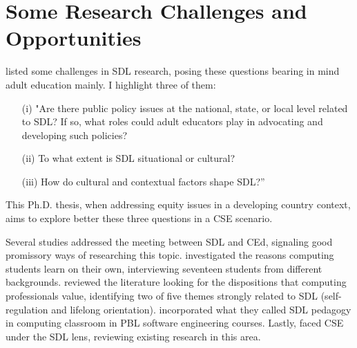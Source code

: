 \section{Some Research Challenges and Opportunities}
\label{sdl-sec:challenges}

 listed some challenges in \gls{SDL} research, posing these questions bearing in mind adult education mainly. I highlight three of them:
\begin{itemize}
    \item[(i)] "Are there public policy issues at the national, state, or local level related to \gls{SDL}? If so, what roles could adult educators play in advocating and developing such policies?
    \item[(ii)] To what extent is \gls{SDL} situational or cultural?
    \item[(iii)] How do cultural and contextual factors shape \gls{SDL}?”
\end{itemize}
This \gls{Ph.D.} thesis, when addressing equity issues in a developing country context, aims to explore better these three questions in a \gls{CSE} scenario.

Several studies addressed the meeting between \gls{SDL} and \gls{CEd}, signaling good promissory ways of researching this topic.  investigated the reasons computing students learn on their own, interviewing seventeen students from different backgrounds.  reviewed the literature looking for the dispositions that computing professionals value, identifying two of five themes strongly related to \gls{SDL} (self-regulation and lifelong orientation).  incorporated what they called \gls{SDL} pedagogy in computing classroom in \gls{PBL} software engineering courses. Lastly,  faced \gls{CSE} under the \gls{SDL} lens, reviewing existing research in this area.